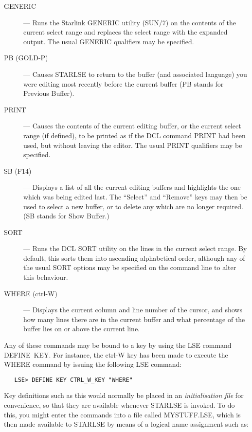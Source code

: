 \begin{description}
\item[GENERIC] --- Runs the Starlink \mbox{GENERIC} utility (SUN/7) on the
contents of the current select range and replaces the select range with the
expanded output. 
The usual \mbox{GENERIC} qualifiers may be specified.

\item[PB (GOLD-P)] --- Causes STARLSE to return to the buffer (and associated
language) you were editing most recently before the current buffer (PB stands
for Previous Buffer).

\item[PRINT] --- Causes the contents of the current editing buffer, or the
current select range (if defined), to be printed as if the \mbox{DCL}
command \mbox{PRINT} had been used, but without leaving the editor. 
The usual \mbox{PRINT} qualifiers may be specified.

\item[SB (F14)] --- Displays a list of all the current editing buffers and
highlights the one which was being edited last. The ``Select'' and ``Remove''
keys may then be used to select a new buffer, or to delete any which are no
longer required. (SB stands for Show Buffer.)

\item[SORT] --- Runs the \mbox{DCL} \mbox{SORT} utility on the lines in the 
current select range.
By default, this sorts them into ascending alphabetical order, although any 
of the usual \mbox{SORT} options may be specified on the command line to 
alter this behaviour.

\item[WHERE (ctrl-W)] --- Displays the current column and line number of the
cursor, and shows how many lines there are in the current buffer and what
percentage of the buffer lies on or above the current line. 

\end{description}

Any of these commands may be bound to a key by using the \mbox{LSE} command
\mbox{DEFINE}~\mbox{KEY}.
For instance, the \mbox{ctrl-W} key has been made to execute the 
\mbox{WHERE} command by issuing the following \mbox{LSE} command: 

\begin{verbatim}
   LSE> DEFINE KEY CTRL_W_KEY "WHERE"
\end{verbatim}

Key definitions such as this would normally be placed in an {\em
initialisation file} for convenience, so that they are available whenever
\mbox{STARLSE} is invoked. 
To do this, you might enter the commands into a file called
\mbox{MYSTUFF.LSE}, which is then made available to \mbox{STARLSE} by means
of a logical name assignment such as: 

